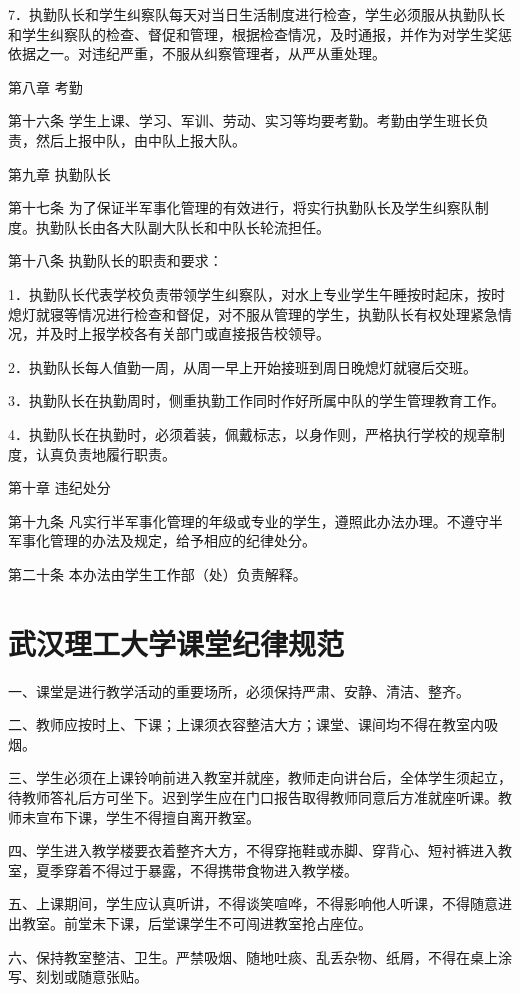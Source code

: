 \documentclass[UTF8,12pt,a4paper]{report}
\begin{document}
7．执勤队长和学生纠察队每天对当日生活制度进行检查，学生必须服从执勤队长和学生纠察队的检查、督促和管理，根据检查情况，及时通报，并作为对学生奖惩依据之一。对违纪严重，不服从纠察管理者，从严从重处理。

第八章 考勤

第十六条 学生上课、学习、军训、劳动、实习等均要考勤。考勤由学生班长负责，然后上报中队，由中队上报大队。

第九章 执勤队长

第十七条 为了保证半军事化管理的有效进行，将实行执勤队长及学生纠察队制度。执勤队长由各大队副大队长和中队长轮流担任。

第十八条 执勤队长的职责和要求：

1．执勤队长代表学校负责带领学生纠察队，对水上专业学生午睡按时起床，按时熄灯就寝等情况进行检查和督促，对不服从管理的学生，执勤队长有权处理紧急情况，并及时上报学校各有关部门或直接报告校领导。

2．执勤队长每人值勤一周，从周一早上开始接班到周日晚熄灯就寝后交班。

3．执勤队长在执勤周时，侧重执勤工作同时作好所属中队的学生管理教育工作。

4．执勤队长在执勤时，必须着装，佩戴标志，以身作则，严格执行学校的规章制度，认真负责地履行职责。

第十章 违纪处分

第十九条 凡实行半军事化管理的年级或专业的学生，遵照此办法办理。不遵守半军事化管理的办法及规定，给予相应的纪律处分。

第二十条 本办法由学生工作部（处）负责解释。

\chapter{武汉理工大学课堂纪律规范}
一、课堂是进行教学活动的重要场所，必须保持严肃、安静、清洁、整齐。

二、教师应按时上、下课；上课须衣容整洁大方；课堂、课间均不得在教室内吸烟。

三、学生必须在上课铃响前进入教室并就座，教师走向讲台后，全体学生须起立，待教师答礼后方可坐下。迟到学生应在门口报告取得教师同意后方准就座听课。教师未宣布下课，学生不得擅自离开教室。

四、学生进入教学楼要衣着整齐大方，不得穿拖鞋或赤脚、穿背心、短衬裤进入教室，夏季穿着不得过于暴露，不得携带食物进入教学楼。

五、上课期间，学生应认真听讲，不得谈笑喧哗，不得影响他人听课，不得随意进出教室。前堂未下课，后堂课学生不可闯进教室抢占座位。

六、保持教室整洁、卫生。严禁吸烟、随地吐痰、乱丢杂物、纸屑，不得在桌上涂写、刻划或随意张贴。
\end{document}
